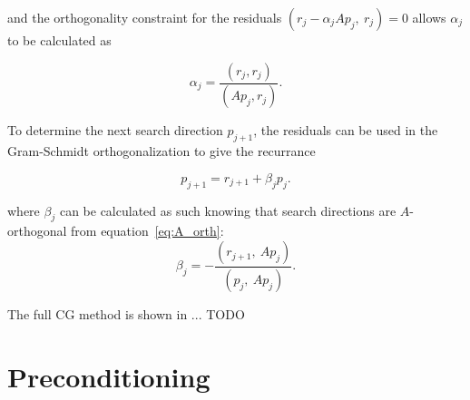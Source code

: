 and the orthogonality constraint for the residuals $\left( r_j - \alpha_j A p_j,\ r_j \right) = 0$  allows $\alpha_j$ to be calculated as

\begin{equation}
    \alpha_j = \frac{\left(r_j, r_j\right)}{\left(Ap_j, r_j\right)}.
\end{equation}

To determine the next search direction $p_{j+1}$, the residuals can be used in the Gram-Schmidt orthogonalization to give the recurrance

\begin{equation}
    p_{j+1} = r_{j+1} + \beta_j p_j.
\end{equation}

where $\beta_j$ can be calculated as such knowing that search directions are $A$-orthogonal from equation~\ref{eq:A_orth}:
\begin{equation}
    \beta_j = - \frac{\left(r_{j+1},\ Ap_j\right)}{\left(p_j,\ Ap_j\right)}.
\end{equation}

The full CG method is shown in ... TODO




\section{Preconditioning}

